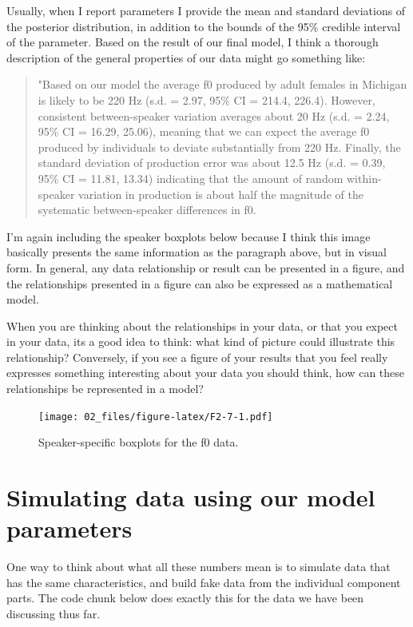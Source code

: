 \documentclass[
]{book}
\begin{document}
Usually, when I report parameters I provide the mean and standard deviations of the posterior distribution, in addition to the bounds of the 95\% credible interval of the parameter. Based on the result of our final model, I think a thorough description of the general properties of our data might go something like:

\begin{quote}
"Based on our model the average f0 produced by adult females in Michigan is likely to be 220 Hz (s.d. = 2.97, 95\% CI = 214.4, 226.4). However, consistent between-speaker variation averages about 20 Hz (s.d. = 2.24, 95\% CI = 16.29, 25.06), meaning that we can expect the average f0 produced by individuals to deviate substantially from 220 Hz. Finally, the standard deviation of production error was about 12.5 Hz (s.d. = 0.39, 95\% CI = 11.81, 13.34) indicating that the amount of random within-speaker variation in production is about half the magnitude of the systematic between-speaker differences in f0.
\end{quote}

I'm again including the speaker boxplots below because I think this image basically presents the same information as the paragraph above, but in visual form. In general, any data relationship or result can be presented in a figure, and the relationships presented in a figure can also be expressed as a mathematical model.

When you are thinking about the relationships in your data, or that you expect in your data, its a good idea to think: what kind of picture could illustrate this relationship? Conversely, if you see a figure of your results that you feel really expresses something interesting about your data you should think, how can these relationships be represented in a model?

\begin{figure}
\centering
\texttt{[image: 02\_files/figure-latex/F2-7-1.pdf]}
\caption{\label{fig:F2-7}Speaker-specific boxplots for the f0 data.}
\end{figure}

\hypertarget{simulating-data-using-our-model-parameters}{%
\section{Simulating data using our model parameters}\label{simulating-data-using-our-model-parameters}}

One way to think about what all these numbers mean is to simulate data that has the same characteristics, and build fake data from the individual component parts. The code chunk below does exactly this for the data we have been discussing thus far.
\end{document}
